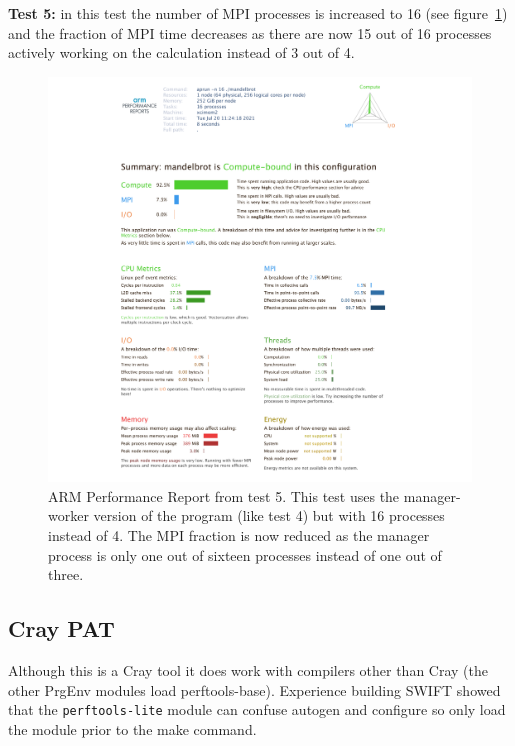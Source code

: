 \documentclass[a4paper,titlepage]{article}
\begin{document}
\noindent
\textbf{Test 5:} in this test the number of MPI processes is increased to 16 (see figure~\ref{fig:perf-report_MB3_16procs}) and the fraction of MPI time decreases as there are now 15 out of 16 processes actively working on the calculation instead of 3 out of 4.
\begin{figure}[htbp]
\begin{center}
\includegraphics[scale=0.35]{figures/mandelbrot_v3_16procs_PerformanceReport}
\caption{ARM Performance Report from test 5. This test uses the manager-worker version of the program (like test 4) but with 16 processes instead of 4. The MPI fraction is now reduced as the manager process is only one out of sixteen processes instead of one out of three.}
\label{fig:perf-report_MB3_16procs}
\end{center}
\end{figure}

\pagebreak 


\subsection{Cray PAT}

Although this is a Cray tool it does work with compilers other than Cray (the other PrgEnv modules load perftools-base). Experience building SWIFT showed that the \texttt{perftools-lite} module can confuse autogen and configure so only load the module prior to the make command. 
\end{document}

